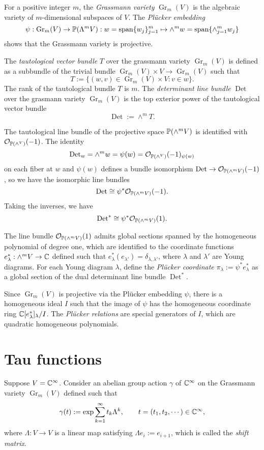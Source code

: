 \documentclass{../../../small}
\newcommand{\Gr}{\operatorname{Gr}}
\newcommand{\Det}{\operatorname{Det}}
\begin{document}
For a positive integer $m$, the \emph{Grassmann variety} $\Gr_m(V)$ is the algebraic variety of $m$-dimensional subspaces of $V$.
The \emph{Pl\"ucker embedding}
\[\psi:\Gr_m(V)\to\P(\Lambda^mV):w=\spn\{w_j\}_{j=1}^m\mapsto\wedge^mw=\spn\{\wedge_{j=1}^mw_j\}\]
shows that the Grassmann variety is projective.

The \emph{tautological vector bundle} $T$ over the grassmann variety $\Gr_m(V)$ is defined as a subbundle of the trivial bundle $\Gr_m(V)\times V\to\Gr_m(V)$ such that
\[T:=\{(w,v)\in\Gr_m(V)\times V:v\in w\}.\]
The rank of the tautological bundle $T$ is $m$.
The \emph{determinant line bundle} $\Det$ over the grasmann variety $\Gr_m(V)$ is the top exterior power of the tautological vector bundle
\[\Det:=\wedge^mT.\]

The tautological line bundle of the projective space $\P(\wedge^mV)$ is identified with $\cO_{\P(\wedge^V)}(-1)$.
The identity
\[\Det_w=\wedge^mw=\psi(w)=\cO_{\P(\wedge^V)}(-1)_{\psi(w)}\]
on each fiber at $w$ and $\psi(w)$ defines a bundle isomorphism $\Det\to\cO_{\P(\wedge^mV)}(-1)$, so we have the isomorphic line bundles
\[\Det\cong\psi^*\cO_{\P(\wedge^mV)}(-1).\]
Taking the inverses, we have
\[\Det^*\cong\psi^*\cO_{\P(\wedge^mV)}(1).\]

The line bundle $\cO_{\P(\wedge^mV)}(1)$ admits global sections spanned by the homogeneous polynomial of degree one, which are identified to the coordinate functions $e_\lambda^*:\wedge^mV\to\C$ defined such that $e_\lambda^*(e_{\lambda'})=\delta_{\lambda,\lambda'}$, where $\lambda$ and $\lambda'$ are Young diagrams.
For each Young diagram $\lambda$, define the \emph{Pl\"ucker coordinate} $\pi_\lambda:=\psi^*e_\lambda^*$ as a global section of the dual determinant line bundle $\Det^*$.

Since $\Gr_m(V)$ is projective via the Pl\"ucker embedding $\psi$, there is a homogeneous ideal $I$ such that the image of $\psi$ has the homogeneous coordinate ring $\C[e_\lambda^*]_\lambda/I$.
The \emph{Pl\"ucker relations} are special generators of $I$, which are quadratic homogeneous polynomials.

\section{Tau functions}

Suppose $V=\C^\infty$.
Consider an abelian group action $\gamma$ of $\C^\infty$ on the Grassmann variety $\Gr_m(V)$ defined such that
\[\gamma(t):=\exp{\sum_{k=1}^\infty t_k\Lambda^k},\qquad t=(t_1,t_2,\cdots)\in\C^\infty,\]
where $\Lambda:V\to V$ is a linear map satisfying $\Lambda e_i:=e_{i+1}$, which is called the \emph{shift matrix}.
\end{document}

